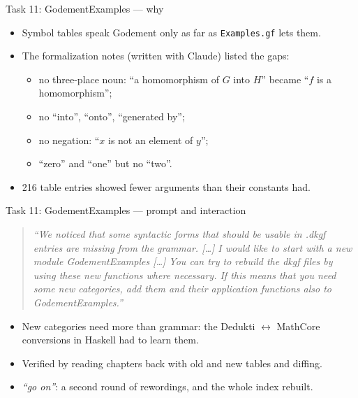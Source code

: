 \documentclass[10pt,aspectratio=169]{beamer}
\newcommand{\bad}[1]{\textcolor{warn}{#1}}
\newcommand{\prompt}[1]{\begin{quote}\small\itshape ``#1''\end{quote}}
\begin{document}
\begin{frame}{Task 11: GodementExamples --- why}
  \begin{itemize}
    \item Symbol tables speak Godement only as far as \texttt{Examples.gf} lets them.
    \item The formalization notes (written with Claude) listed the gaps:
      \begin{itemize}\small
        \item no three-place noun: ``a homomorphism of $G$ into $H$'' became
              \bad{``$f$ is a homomorphism''};
        \item no ``into'', ``onto'', ``generated by'';
        \item no negation: ``$x$ is not an element of $y$'';
        \item ``zero'' and ``one'' but no ``two''.
      \end{itemize}
    \item 216 table entries showed fewer arguments than their constants had.
  \end{itemize}
\end{frame}

\begin{frame}{Task 11: GodementExamples --- prompt and interaction}
  \prompt{We noticed that some syntactic forms that should be usable in .dkgf
    entries are missing from the grammar. [\dots] I would like to start with a new
    module GodementExamples [\dots] You can try to rebuild the dkgf files by using
    these new functions where necessary. If this means that you need some new
    categories, add them and their application functions also to GodementExamples.}
  \begin{itemize}\small
    \item New categories need more than grammar: the Dedukti $\leftrightarrow$ MathCore
          conversions in Haskell had to learn them.
    \item Verified by reading chapters back with old and new tables and diffing.
    \item \emph{``go on''}: a second round of rewordings, and the whole index rebuilt.
  \end{itemize}
\end{frame}
\end{document}
